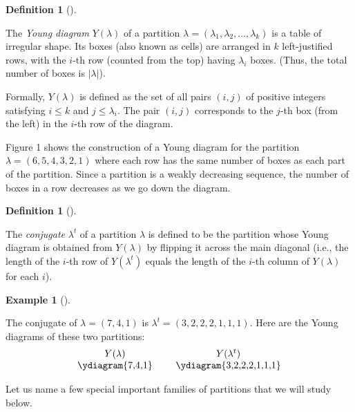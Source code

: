 \documentclass[numbers=enddot,12pt,final,onecolumn,notitlepage]{scrartcl}%
\theoremstyle{definition}
\newtheorem{defi}[theo]{Definition}
\newenvironment{definition}[1][]
{\begin{defi}[#1]\begin{leftbar}}
{\end{leftbar}\end{defi}}
\newtheorem{exam}[theo]{Example}
\newenvironment{example}[1][]
{\begin{exam}[#1]\begin{leftbar}}
{\end{leftbar}\end{exam}}
\newcommand{\abs}[1]{\left| #1 \right|}
\newcommand{\tup}[1]{\left( #1 \right)}
\renewcommand{\leq}{\leqslant}
\theoremstyle{plainsl}
\begin{document}
\begin{definition}
The \emph{Young diagram} $Y\tup{\lambda}$ of a partition
$\lambda = \left(\lambda_1, \lambda_2, \ldots, \lambda_k\right)$
is a table of irregular shape.
Its boxes (also known as cells) are arranged in
$k$ left-justified rows, with the $i$-th row (counted from the top)
having $\lambda_i$ boxes. (Thus, the total number of boxes
is $\abs{\lambda}$).

Formally, $Y\tup{\lambda}$ is defined as the set of all pairs
$\tup{i, j}$ of positive integers satisfying $i \leq k$ and
$j \leq \lambda_i$. The pair $\tup{i, j}$ corresponds to the
$j$-th box (from the left) in the $i$-th row of the diagram.
\end{definition}

Figure 1 shows the construction of a Young diagram for the partition $\lambda = (6,5,4,3,2,1)$ where each row has the same number of boxes as each part of the partition. Since a partition is a weakly decreasing sequence, the number of boxes in a row decreases as we go down the diagram.

\begin{definition}
The \emph{conjugate} $\lambda^t$ of a partition $\lambda$ is defined to be the partition whose Young diagram is obtained from $Y\tup{\lambda}$ by flipping it across the main diagonal (i.e., the length of the $i$-th row of $Y\tup{\lambda^t}$ equals the length of the $i$-th column of $Y\tup{\lambda}$ for each $i$).
\end{definition} 

\begin{example}
The conjugate of $\lambda = (7,4,1)$ is $\lambda^t =(3,2,2,2,1,1,1)$.
Here are the Young diagrams of these two partitions:
\[
\begin{tabular}{ccc}
$Y(\lambda)$ & & $Y(\lambda^t)$ \\
\ydiagram{7,4,1}
&
&
\ydiagram{3,2,2,2,1,1,1}
\end{tabular}
\]
\end{example}

Let us name a few special important families of partitions that we will study below.
\end{document}

